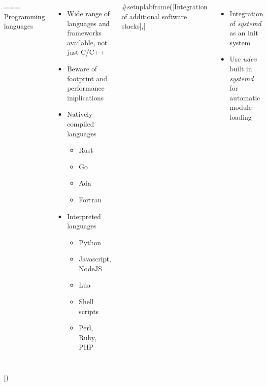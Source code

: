 \begin{columns}[T]
=== {Programming languages}
  \begin{itemize}
  \item Wide range of languages and frameworks available, not just C/C++
  \item Beware of footprint and performance implications
  \item Natively compiled languages
    \begin{itemize}
    \item Rust
    \item Go
    \item Ada
    \item Fortran
    \end{itemize}
  \item Interpreted languages
    \begin{itemize}
    \item Python
    \item Javascript, NodeJS
    \item Lua
    \item Shell scripts
    \item Perl, Ruby, PHP
    \end{itemize}
  \end{itemize}


#setuplabframe([Integration of additional software stacks],[
  \begin{itemize}
  \item Integration of {\em systemd} as an init system
  \item Use {\em udev} built in {\em systemd} for automatic module
    loading
  \end{itemize}
\end{columns}
])

